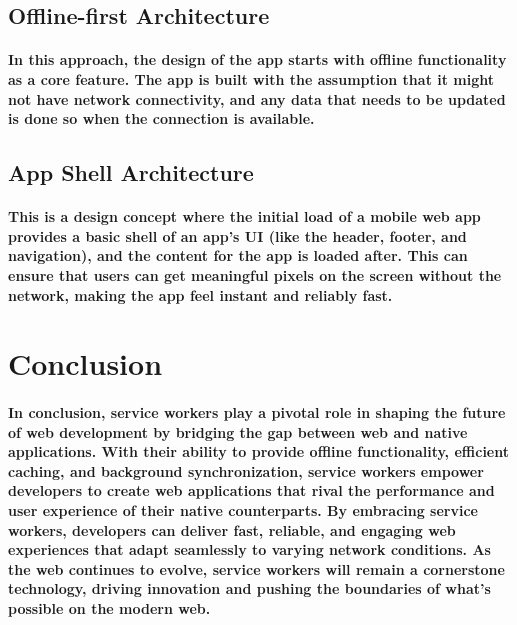 \documentclass[12pt,a4paper]{article}
\begin{document}
    \subsection{Offline-first Architecture}

    \paragraph{In this approach, the design of the app starts with offline functionality as a core feature. The app is built with the assumption that it might not have network connectivity, and any data that needs to be updated is done so when the connection is available.}

    \subsection{App Shell Architecture}

    \paragraph{This is a design concept where the initial load of a mobile web app provides a basic shell of an app’s UI (like the header, footer, and navigation), and the content for the app is loaded after. This can ensure that users can get meaningful pixels on the screen without the network, making the app feel instant and reliably fast.}

    \section{Conclusion}

    \paragraph{In conclusion, service workers play a pivotal role in shaping the future of web
    development by bridging the gap between web and native applications. With their
    ability to provide offline functionality, efficient caching, and background
    synchronization, service workers empower developers to create web applications that
    rival the performance and user experience of their native counterparts. By embracing
    service workers, developers can deliver fast, reliable, and engaging web experiences
    that adapt seamlessly to varying network conditions. As the web continues to evolve,
    service workers will remain a cornerstone technology, driving innovation and pushing
    the boundaries of what's possible on the modern web.}
\end{document}
